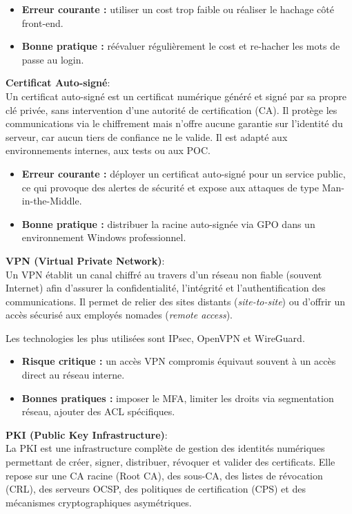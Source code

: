 \begin{itemize}
  \item \textbf{Erreur courante :} utiliser un cost trop faible ou réaliser le hachage côté front-end.
  \item \textbf{Bonne pratique :} réévaluer régulièrement le cost et re-hacher les mots de passe au login.
\end{itemize}

\medskip
\noindent \textbf{Certificat Auto-signé}:\\
Un certificat auto-signé est un certificat numérique généré et signé par sa propre clé privée, sans intervention d’une autorité de certification (CA). Il protège les communications via le chiffrement mais n’offre aucune garantie sur l’identité du serveur, car aucun tiers de confiance ne le valide. Il est adapté aux environnements internes, aux tests ou aux POC.\\
\begin{itemize}
  \item \textbf{Erreur courante :} déployer un certificat auto-signé pour un service public, ce qui provoque des alertes de sécurité et expose aux attaques de type Man-in-the-Middle.
  \item \textbf{Bonne pratique :} distribuer la racine auto-signée via GPO dans un environnement Windows professionnel.
\end{itemize}

\medskip
\noindent \textbf{VPN (Virtual Private Network)}:\\
Un VPN établit un canal chiffré au travers d’un réseau non fiable (souvent Internet) afin d’assurer la confidentialité, l’intégrité et l’authentification des communications. Il permet de relier des sites distants (\textit{site-to-site}) ou d’offrir un accès sécurisé aux employés nomades (\textit{remote access}).

\newpage

\noindent Les technologies les plus utilisées sont IPsec, OpenVPN et WireGuard.

\begin{itemize}
  \item \textbf{Risque critique :} un accès VPN compromis équivaut souvent à un accès direct au réseau interne.
  \item \textbf{Bonnes pratiques :} imposer le MFA, limiter les droits via segmentation réseau, ajouter des ACL spécifiques.
\end{itemize}


\medskip
\noindent \textbf{PKI (Public Key Infrastructure)}:\\
La PKI est une infrastructure complète de gestion des identités numériques permettant de créer, signer, distribuer, révoquer et valider des certificats. Elle repose sur une CA racine (Root CA), des sous-CA, des listes de révocation (CRL), des serveurs OCSP, des politiques de certification (CPS) et des mécanismes cryptographiques asymétriques.


